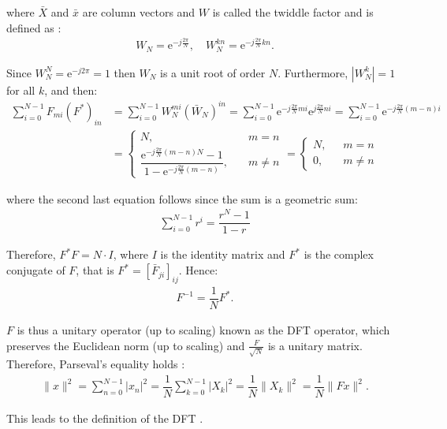 where $\bar{X}$ and $\bar{x}$ are column vectors and $W$ is called the twiddle factor and is defined as \cite{DFT_OX}:
\begin{align*}
	W_N = \text{e}^{-j\frac{2 \pi}{N}}, \quad W_N^{kn} = \text{e}^{-j\frac{2 \pi}{N}kn}.
\end{align*}

Since $W_N^N = \text{e}^{-j2\pi} = 1$ then $W_N$ is a unit root of order $N$. Furthermore, $|W_N^k| = 1$ for all $k$, and then:
\begin{align*}
\sum_{i=0}^{N-1} F_{mi} (F^*)_{in} &= \sum_{i=0}^{N-1} W_N^{mi} (\bar{W}_N)^{in} = \sum_{i=0}^{N-1} \text{e}^{-j\frac{2\pi}{N}mi} \text{e}^{j\frac{2\pi}{N}ni} = \sum_{i=0}^{N-1} \text{e}^{-j\frac{2\pi}{N}(m-n)i} \\ &=
\begin{cases}
N, &m = n \\
\dfrac{\text{e}^{-j\frac{2\pi}{N}(m-n)N}-1}{1-\text{e}^{-j\frac{2\pi}{N}(m-n)}}, \quad &m \neq n
\end{cases} =
\begin{cases}
N, &m = n \\
0, \quad &m \neq n
\end{cases}
\end{align*}

where the second last equation follows since the sum is a geometric sum:
\begin{align*}
\sum_{i=0}^{N-1} r^i = \dfrac{r^N-1}{1-r}
\end{align*}

Therefore, $F^*F = N \cdot I$, where $I$ is the identity matrix and $F^*$ is the complex conjugate of $F$, that is $F^* = [\bar{F}_{ji}]_{ij}$. Hence:
\begin{align*}
F^{-1} = \dfrac{1}{N} F^*.
\end{align*}

$F$ is thus a unitary operator (up to scaling) known as the DFT operator, which preserves the Euclidean norm (up to scaling) and $\frac{F}{\sqrt{N}}$ is a unitary matrix. Therefore, Parseval's equality holds \cite{page 258, FSP}:
\begin{align*}
\|x\|^2 = \sum_{n=0}^{N-1} |x_n|^2 = \dfrac{1}{N} \sum_{k=0}^{N-1} |X_k|^2 = \dfrac{1}{N} \|X_k\|^2 = \dfrac{1}{N} \|Fx\|^2.
\end{align*}

This leads to the definition of the DFT \cite{page 253, FSP}.

